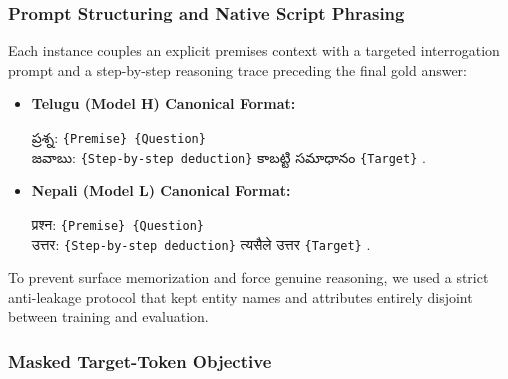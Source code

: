 \documentclass[8pt]{article}
\newcommand{\telugu}[1]{{\telugufont #1}}
\newcommand{\nepali}[1]{{\nepalifont #1}}
\begin{document}
\subsubsection{Prompt Structuring and Native Script Phrasing}
Each instance couples an explicit premises context with a targeted interrogation prompt and a step-by-step reasoning trace preceding the final gold answer:
\begin{itemize}
    \item \textbf{Telugu (Model H) Canonical Format:}
    \begin{center}
    \telugu{ప్రశ్న:} \texttt{\{Premise\} \{Question\}} \\
    \telugu{జవాబు:} \texttt{\{Step-by-step deduction\}} \telugu{కాబట్టి సమాధానం} \texttt{\{Target\}} .
    \end{center}
    \item \textbf{Nepali (Model L) Canonical Format:}
    \begin{center}
    \nepali{प्रश्न:} \texttt{\{Premise\} \{Question\}} \\
    \nepali{उत्तर:} \texttt{\{Step-by-step deduction\}} \nepali{त्यसैले उत्तर} \texttt{\{Target\}} .
    \end{center}
\end{itemize}

To prevent surface memorization and force genuine reasoning, we used a strict anti-leakage protocol that kept entity names and attributes entirely disjoint between training and evaluation.

\subsubsection{Masked Target-Token Objective}
\end{document}
